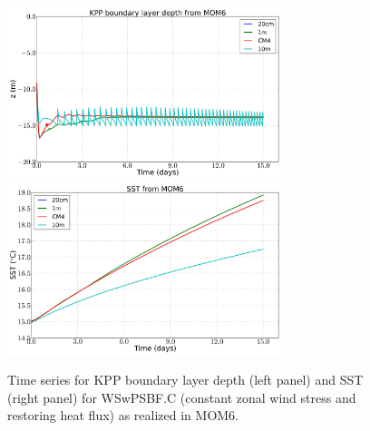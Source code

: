 \begin{figure}[h!t]
\begin{center}
\includegraphics[angle=0,width=8cm]{./figs/MOM6/WSwPSBF_C_MOM6_KPP_bldepth.png}
\includegraphics[angle=0,width=8cm]{./figs/MOM6/WSwPSBF_C_MOM6_SST.png}
\caption[KPP boundary layer depth and SST from MOM6 for WSwPSBF.C]
{\sf Time series for KPP boundary layer depth (left panel) and SST
  (right panel) for WSwPSBF.C (constant zonal wind stress and
  restoring heat flux) as realized in MOM6.}
\label{fig:WSwPSBF_C_MOM6_SST_bldepth}
\end{center}
\end{figure}


